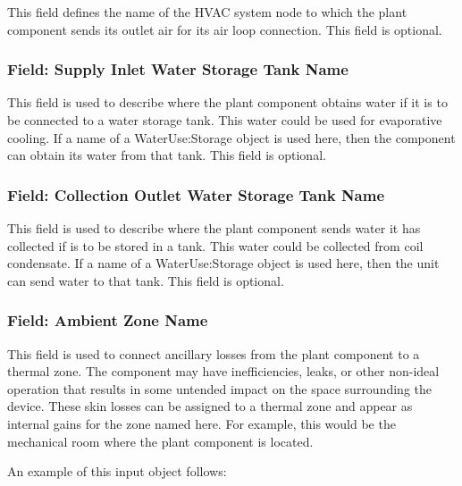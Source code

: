 This field defines the name of the HVAC system node to which the plant component sends its outlet air for its air loop connection. This field is optional.

\subsubsection{Field: Supply Inlet Water Storage Tank Name}\label{field-supply-inlet-water-storage-tank-name-3}

This field is used to describe where the plant component obtains water if it is to be connected to a water storage tank. This water could be used for evaporative cooling. If a name of a WaterUse:Storage object is used here, then the component can obtain its water from that tank. This field is optional.

\subsubsection{Field: Collection Outlet Water Storage Tank Name}\label{field-collection-outlet-water-storage-tank-name-3}

This field is used to describe where the plant component sends water it has collected if is to be stored in a tank. This water could be collected from coil condensate. If a name of a WaterUse:Storage object is used here, then the unit can send water to that tank. This field is optional.

\subsubsection{Field: Ambient Zone Name}\label{field-ambient-zone-name-3}

This field is used to connect ancillary losses from the plant component to a thermal zone. The component may have inefficiencies, leaks, or other non-ideal operation that results in some untended impact on the space surrounding the device. These skin losses can be assigned to a thermal zone and appear as internal gains for the zone named here. For example, this would be the mechanical room where the plant component is located.

An example of this input object follows:

